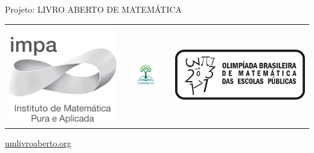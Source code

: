\documentclass[a4,12pt]{book} %
\begin{document}
\begin{changemargin}{-5cm}{-5cm}
{\fontsize{10}{12}\selectfont
\vspace*{1cm}

\begin{center}
Projeto: LIVRO ABERTO DE MATEMÁTICA

\noindent \begin{tabular}{lcccr}
\includegraphics[scale=.15]{impa}& \quad\quad& \includegraphics[width=3cm]{logo.jpg} & \quad\quad& \includegraphics[scale=.24]{obmep}
\end{tabular}

\url{umlivroaberto.org}
\vspace{.1cm}


\end{center}}
\end{changemargin}
\end{document}
